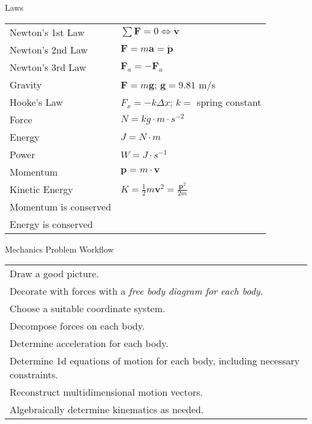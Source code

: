 %
%
%


\begin{section}{Laws}
\begin{tabular}{l l}
  Newton's 1st Law & $\sum \mathbf{F} = 0 \Leftrightarrow \dot{\mathbf{v}}$ \\
  Newton's 2nd Law & $\mathbf{F} =  m\mathbf{a} = \dot{\mathbf{p}}$ \\
  Newton's 3rd Law & $\mathbf{F}_a = -\mathbf{F}_a $ \\
  Gravity & $\mathbf{F} = m\mathbf{g}$; $\mathbf{g}=9.81$ m/s \\
  Hooke's Law & $F_x = -k\Delta x$; $k=$ spring constant \\
  Force & $N = kg \cdot m \cdot s^{-2}$ \\
  Energy & $J = N \cdot m$ \\
  Power & $W = J \cdot s^{-1}$ \\
  Momentum & $\mathbf{p} = m \cdot \mathbf{v}$ \\
  Kinetic Energy & $K=\tfrac{1}{2}m\mathbf{v}^2=\frac{\mathbf{p}^2}{2m}$ \\
  Momentum is conserved & \\
  Energy is conserved & \\
\end{tabular}
\end{section}

\begin{section}{Mechanics Problem Workflow}
\begin{tabular}{l}
  Draw a good picture. \\
  Decorate with forces with a \em{free body diagram} for each body. \\
  Choose a suitable coordinate system. \\
  Decompose forces on each body. \\
  Determine acceleration for each body. \\
  Determine 1d equations of motion for each body, including necessary constraints. \\
  Reconstruct multidimensional motion vectors. \\
  Algebraically determine kinematics as needed. \\
\end{tabular}
\end{section}
